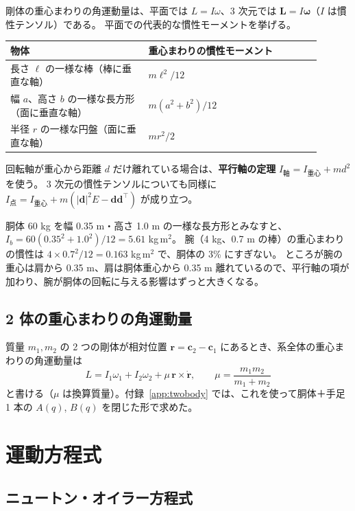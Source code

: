 剛体の重心まわりの角運動量は、平面では $L = I\omega$、3 次元では $\bm L = I\bm\omega$（$I$ は慣性テンソル）である。
平面での代表的な慣性モーメントを挙げる。
\begin{longtable}{p{0.40\linewidth}p{0.50\linewidth}}
\toprule
物体 & 重心まわりの慣性モーメント \\ \midrule \endhead
長さ $\ell$ の一様な棒（棒に垂直な軸） & $m\ell^2/12$ \\
幅 $a$、高さ $b$ の一様な長方形（面に垂直な軸） & $m(a^2+b^2)/12$ \\
半径 $r$ の一様な円盤（面に垂直な軸） & $mr^2/2$ \\
\bottomrule
\end{longtable}
回転軸が重心から距離 $d$ だけ離れている場合は、\textbf{平行軸の定理} $I_{\text{軸}} = I_{\text{重心}} + md^2$ を使う。
3 次元の慣性テンソルについても同様に $I_{\text{点}} = I_{\text{重心}} + m(|\bm d|^2E - \bm d\bm d^\top)$ が成り立つ。

\begin{example}[本報告書の人間大モデルの胴体]
胴体 60 kg を幅 0.35 m・高さ 1.0 m の一様な長方形とみなすと、$I_b = 60(0.35^2+1.0^2)/12 = 5.61$ kg\,m$^2$。
腕（4 kg、0.7 m の棒）の重心まわりの慣性は $4\times0.7^2/12 = 0.163$ kg\,m$^2$ で、胴体の 3\% にすぎない。
ところが腕の重心は肩から 0.35 m、肩は胴体重心から 0.35 m 離れているので、平行軸の項が加わり、腕が胴体の回転に与える影響はずっと大きくなる。
\end{example}

\subsection{2 体の重心まわりの角運動量}

質量 $m_1, m_2$ の 2 つの剛体が相対位置 $\bm r = \bm c_2-\bm c_1$ にあるとき、系全体の重心まわりの角運動量は
\begin{equation}
L = I_1\omega_1 + I_2\omega_2 + \mu\,\bm r\times\dot{\bm r},\qquad \mu = \frac{m_1m_2}{m_1+m_2}
\end{equation}
と書ける（$\mu$ は換算質量）。付録~\ref{app:twobody} では、これを使って胴体＋手足 1 本の $A(q)$, $B(q)$ を閉じた形で求めた。

\section{運動方程式}

\subsection{ニュートン・オイラー方程式}

